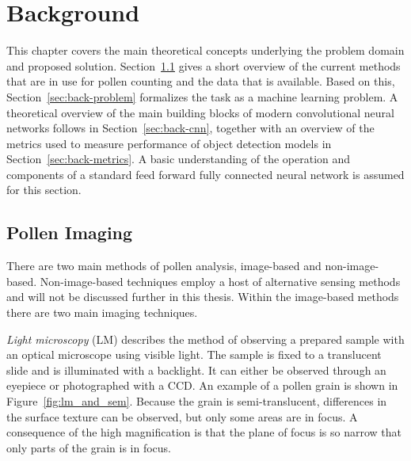 \chapter{Background}\label{cha:background}
This chapter covers the main theoretical concepts underlying the problem domain and proposed solution.
Section~\ref{sec:back-pollen} gives a short overview of the current methods that are in use for pollen counting and the data that is available. Based on this, Section~\ref{sec:back-problem} formalizes the task as a machine learning problem.
A theoretical overview of the main building blocks of modern convolutional neural networks follows in Section~\ref{sec:back-cnn}, together with an overview of the metrics used to measure performance of object detection models in Section~\ref{sec:back-metrics}.
A basic understanding of the operation and components of a standard feed forward fully connected neural network is assumed for this section.

\section{Pollen Imaging}\label{sec:back-pollen}
There are two main methods of pollen analysis, image-based and non-image-based.
Non-image-based techniques employ a host of alternative sensing methods and will not be discussed further in this thesis.
Within the image-based methods there are two main imaging techniques.

\textit{Light microscopy} (LM) describes the method of observing a prepared sample with an optical microscope using visible light.
The sample is fixed to a translucent slide and is illuminated with a backlight.
It can either be observed through an eyepiece or photographed with a CCD\@.
An example of a pollen grain is shown in Figure~\ref{fig:lm_and_sem}.
Because the grain is semi-translucent, differences in the surface texture can be observed, but only some areas are in focus.
A consequence of the high magnification is that the plane of focus is so narrow that only parts of the grain is in focus.


